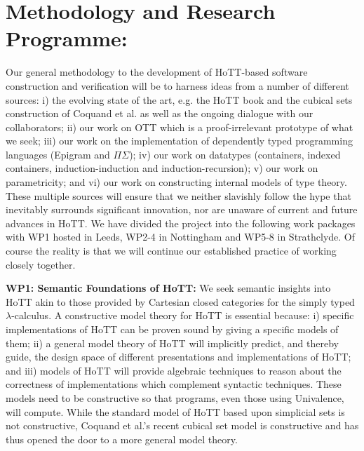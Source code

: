 \documentclass[a4paper,11pt]{article}
\begin{document}


\section{Methodology and Research Programme:}



Our general methodology to the development of HoTT-based software
construction and verification will be to harness ideas from a number
of different sources: i) the evolving state of the art, e.g. the HoTT
book and the cubical sets construction of Coquand et al. as well as
the ongoing dialogue with our collaborators; ii) our work on OTT which
is a proof-irrelevant prototype of what we seek; iii) our work on the
implementation of dependently typed programming languages (Epigram and
$\Pi\Sigma$); iv) our work on datatypes (containers, indexed
containers, induction-induction and induction-recursion); v) our work
on parametricity; and vi) our work on constructing internal models of
type theory. These multiple sources will ensure that we neither
slavishly follow the hype that inevitably surrounds significant
innovation, nor are unaware of current and future advances in HoTT. We
have divided the project into the following work packages with WP1
hosted in Leeds, WP2-4 in Nottingham and WP5-8 in Strathclyde. Of course
the reality is that we will continue our established practice of
working closely together.


{\bf WP1: Semantic Foundations of HoTT:}  We
seek semantic insights into HoTT akin to those provided by Cartesian
closed categories for the simply typed
$\lambda$-calculus.  A constructive model theory for HoTT is essential because: i)
specific implementations of HoTT can be proven sound by giving a specific
models of them; ii) 
a general model theory of HoTT will implicitly predict, and thereby
guide, the design space of different presentations and implementations
of HoTT; and iii) models of HoTT will provide algebraic techniques to
reason about the correctness of implementations which complement
syntactic techniques. These models need to be constructive so that
programs, even those using Univalence, will compute. While the
standard model of HoTT based upon simplicial sets is not constructive,
Coquand et al.'s recent cubical set model is constructive and 
has thus opened the door to a more general model theory.
\end{document}
